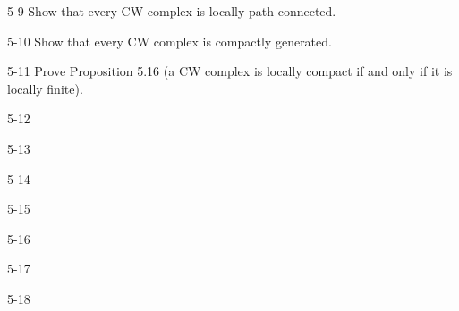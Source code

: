 \begin{problem}{5-9}\label{problem:5-9}
Show that every CW complex is locally path-connected.
\end{problem}

\begin{problem}{5-10}\label{problem:5-10}
Show that every CW complex is compactly generated.
\end{problem}

\begin{problem}{5-11}\label{problem:5-11}
Prove Proposition 5.16 (a CW complex is locally compact if and only if it is locally finite).
\end{problem}

\begin{problem}{5-12}\label{problem:5-12}
\end{problem}

\begin{problem}{5-13}\label{problem:5-13}
\end{problem}

\begin{problem}{5-14}\label{problem:5-14}
\end{problem}

\begin{problem}{5-15}\label{problem:5-15}
\end{problem}

\begin{problem}{5-16}\label{problem:5-16}
\end{problem}

\begin{problem}{5-17}\label{problem:5-17}
\end{problem}

\begin{problem}{5-18}\label{problem:5-18}
\end{problem}
